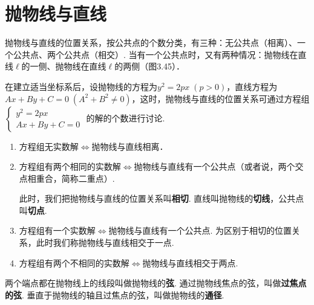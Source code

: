 \section{抛物线与直线}
抛物线与直线的位置关系，按公共点的个数分类，有三种：无公共点（相离）、一个公共点、两个公共点（相交）. 当有一个公共点时，又有两种情况：抛物线在直线$\ell$的一侧、抛物线在直线$\ell$的两侧（图3.45）．

\begin{figure}[htp]
    \centering
{}
    \caption{}
\end{figure}

在建立适当坐标系后，设抛物线的方程为$y^2=2px\; (p>0)$，直线方程为$Ax+By+C=0\; (A^2+B^2\ne 0)$，这时，抛物线与直线的位置关系可通过方程组
$\begin{cases}
    y^2=2px\\
    Ax+By+C=0
\end{cases}$
的解的个数进行讨论.

\begin{enumerate}[(1)]
\item 方程组无实数解$\Longleftrightarrow$抛物线与直线相离．
\item 方程组有两个相同的实数解$\Longleftrightarrow$抛物线与直线有一个公共点（或者说，两个交点相重合，简称二重点）.

此时，我们把抛物线与直线的位置关系叫\textbf{相切}. 直线叫抛物线的\textbf{切线}，公共点叫\textbf{切点}.
\item 方程组有一个实数解$\Longleftrightarrow$抛物线与直线有一个公共点. 为区别于相切的位置关系，此时我们称抛物线与直线相交于一点.
\item 方程组有两个不相同的实数解$\Longleftrightarrow$抛物线与直线相交于两点.
\end{enumerate}

两个端点都在抛物线上的线段叫做抛物线的\textbf{弦}. 通过抛物线焦点的弦，叫做\textbf{过焦点的弦}. 垂直于抛物线的轴且过焦点的弦，叫做抛物线的\textbf{通径}.

